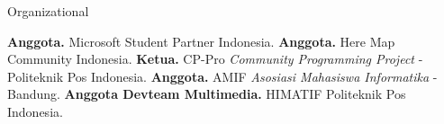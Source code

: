 \begin{rubric}{Organizational}

\entry*[2014 -- 2018]%
	\textbf{Anggota.} Microsoft Student Partner Indonesia.
%
\entry*[2014 -- 2016]%
	\textbf{Anggota.} Here Map Community Indonesia.
%
\entry*[2013 -- 2014]%
	\textbf{Ketua.} CP-Pro \textit{Community Programming Project} - Politeknik Pos Indonesia.
%
\entry*[2013 -- 2014]%
	\textbf{Anggota.} AMIF \textit{Asosiasi Mahasiswa Informatika} - Bandung.
%
\entry*[2012 -- 2013]%
	\textbf{Anggota Devteam Multimedia.} HIMATIF Politeknik Pos Indonesia.
%
\end{rubric}